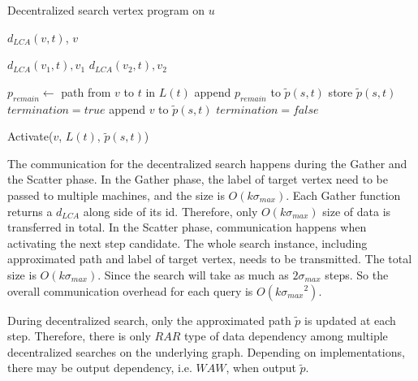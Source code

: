 \begin{algorithm}
    \caption{Decentralized search vertex program on $u$}
		\label{alg:vc_dec}
    \begin{algorithmic}
						\State \Return $d_{LCA}(v, t)$, $v$
				\EndFunction

								\State \Return $d_{LCA}(v_1,t), v_1$
						\Else
								\State \Return $d_{LCA}(v_2,t), v_2$
						\EndIf
				\EndFunction

								\State $p_{remain} \gets$ path from $v$ to $t$ in $L(t)$
								\State append $p_{remain}$ to $\tilde{p}(s,t)$
								\State store $\tilde{p}(s,t)$
								\State $termination = true$
						\Else
								\State append $v$ to $\tilde{p}(s,t)$
								\State $termination = false$
						\EndIf
				\EndFunction

						\If {$\neg termination$}
								\State Activate($v$, $L(t)$, $\tilde{p}(s,t)$)
						\EndIf
        \EndFunction
    \end{algorithmic}
\end{algorithm}
The communication for the decentralized search happens during the Gather and the Scatter phase. In the Gather phase, the label of target vertex need to be passed to multiple machines, and the size is $O(k{\sigma}_{max})$. Each Gather function returns a $d_{LCA}$ along side of its id. Therefore, only $O(k{\sigma}_{max})$ size of data is transferred in total. In the Scatter phase, communication happens when activating the next step candidate. The whole search instance, including approximated path and label of target vertex, needs to be transmitted. The total size is $O(k{\sigma}_{max})$. Since the search will take as much as $2{\sigma}_{max}$ steps. So the overall communication overhead for each query is $O(k{{\sigma}_{max}}^2)$. 

During decentralized search, only the approximated path $\tilde{p}$ is updated at each step. Therefore, there is only $RAR$ type of data dependency among multiple decentralized searches on the underlying graph. Depending on implementations, there may be output dependency, i.e. $WAW$, when output $\tilde{p}$.

%
